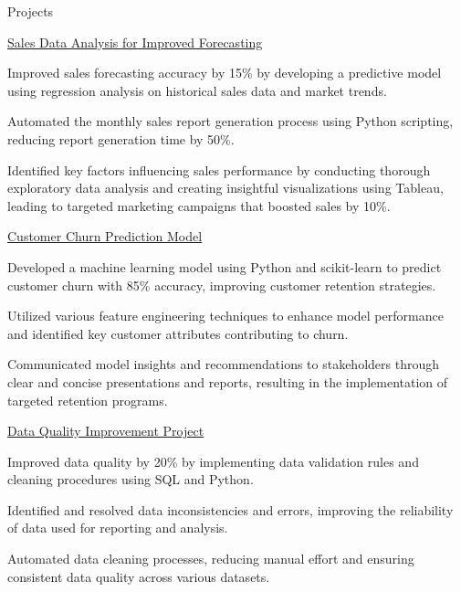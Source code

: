 \documentclass{resume} %
\begin{document}
    \begin{rSection}{Projects}
                    \begin{rSubsection}
                                    {\href{null}{Sales Data Analysis for Improved Forecasting}}
                                {}{}{}
                                    \item Improved sales forecasting accuracy by 15\% by developing a predictive model using regression analysis on historical sales data and market trends.
                                    \item Automated the monthly sales report generation process using Python scripting, reducing report generation time by 50\%.
                                    \item Identified key factors influencing sales performance by conducting thorough exploratory data analysis and creating insightful visualizations using Tableau, leading to targeted marketing campaigns that boosted sales by 10\%.
                            \end{rSubsection}
                    \begin{rSubsection}
                                    {\href{null}{Customer Churn Prediction Model}}
                                {}{}{}
                                    \item Developed a machine learning model using Python and scikit{-}learn to predict customer churn with 85\% accuracy, improving customer retention strategies.
                                    \item Utilized various feature engineering techniques to enhance model performance and identified key customer attributes contributing to churn.
                                    \item Communicated model insights and recommendations to stakeholders through clear and concise presentations and reports, resulting in the implementation of targeted retention programs.
                            \end{rSubsection}
                    \begin{rSubsection}
                                    {\href{null}{Data Quality Improvement Project}}
                                {}{}{}
                                    \item Improved data quality by 20\% by implementing data validation rules and cleaning procedures using SQL and Python.
                                    \item Identified and resolved data inconsistencies and errors, improving the reliability of data used for reporting and analysis.
                                    \item Automated data cleaning processes, reducing manual effort and ensuring consistent data quality across various datasets.
                            \end{rSubsection}
            \end{rSection}
\end{document}
